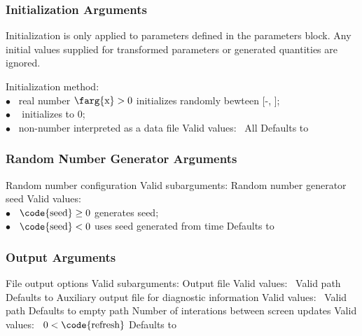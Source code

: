 \subsubsection{Initialization Arguments}

Initialization is only applied to parameters defined in the parameters
block.  Any initial values supplied for transformed parameters or
generated quantities are ignored.

\begin{description}
  {Initialization method: \\
        \hspace*{8pt} $\bullet$ \ real number $\mbox{\farg{x}} > 0$ initializes randomly bewteen [-,
        ];
        \\
        \hspace*{8pt} $\bullet$ \   initializes to 0;
        \\
        \hspace*{8pt} $\bullet$ \  non-number interpreted as a data file}
  {Valid values: \  All}
  {Defaults to }
%
\end{description}


\subsubsection{Random Number Generator Arguments}

\begin{description}

  {Random number configuration}
  {Valid subarguments: }
%
    {Random number generator seed}
    {Valid values: \\
      \hspace*{8pt} $\bullet$ \ $\mbox{\code{seed}} \geq 0$ generates seed;
      \\
      \hspace*{8pt} $\bullet$ \ $\mbox{\code{seed}} < 0$ uses seed generated from time}
    {Defaults to }
%
\end{description}

\subsubsection{Output Arguments}

\begin{description}
  {File output options}
  {Valid subarguments: }
%
    {Output file}
    {Valid values: \  Valid path}
    {Defaults to }
%
    {Auxiliary output file for diagnostic information}
    {Valid values: \  Valid path}
    {Defaults to empty path}
%
    {Number of interations between screen updates}
    {Valid values: \  $0 < \mbox{\code{refresh}}$}
    {Defaults to }
%
\end{description}

